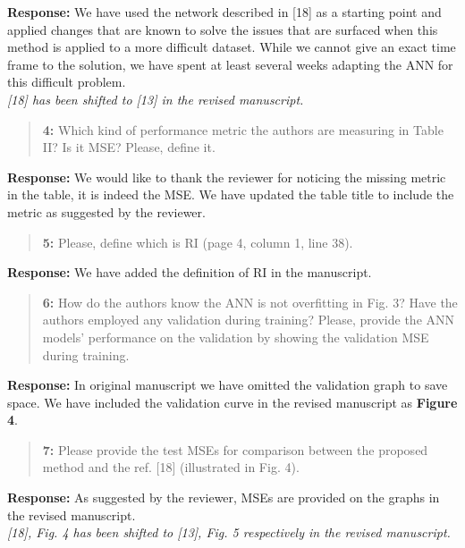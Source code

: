 \documentclass{article}
\begin{document}
	\textbf{Response: }We have used the network described in [18] as a starting point and applied changes that are known to solve the issues that are surfaced when this method is applied to a more difficult dataset. While we cannot give an exact time frame to the solution, we have spent at least several weeks adapting the ANN for this difficult problem. \\
	
	\textit{[18] has been shifted to [13] in the revised manuscript.}
	
	\begin{quote}
		\textbf{4: }Which kind of performance metric the authors are measuring in Table II? Is it MSE? Please, define it.
	\end{quote}
	
	\textbf{Response: }We would like to thank the reviewer for noticing the missing metric in the table, it is indeed the MSE. We have updated the table title to include the metric as suggested by the reviewer.
	
	\begin{quote}
		\textbf{5: }Please, define which is RI (page 4, column 1, line 38).
	\end{quote}
	
	\textbf{Response: }We have added the definition of RI in the manuscript.
	
	\begin{quote}
		\textbf{6: }How do the authors know the ANN is not overfitting in Fig. 3? Have the authors employed any validation during training? Please, provide the ANN models' performance on the validation by showing the validation MSE during training.
	\end{quote}
	
	\textbf{Response: }In original manuscript we have omitted the validation graph to save space. We have included the validation curve in the revised manuscript as \textbf{Figure 4}.
	
	\begin{quote}
		\textbf{7: }Please provide the test MSEs for comparison between the proposed method and the ref. [18] (illustrated in Fig. 4).
	\end{quote}
	
	\textbf{Response: }As suggested by the reviewer, MSEs are provided on the graphs in the revised manuscript. \\
	
	\textit{[18], Fig. 4 has been shifted to [13], Fig. 5 respectively in the revised manuscript.}
	
\end{document}
